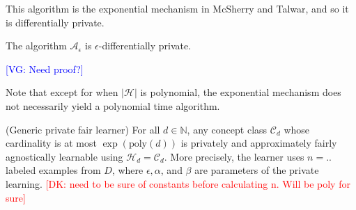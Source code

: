 \documentclass[format = sigconf]{acmart}
\newcommand{\dk}[1]{\textcolor{red}{[DK: #1]}}
\newcommand{\vg}[1]{\textcolor{blue}{[VG: #1]}}
\newcommand{\A}{\mathcal{A}}
\renewcommand{\H}{\mathcal{H}}
\renewcommand{\C}{\mathcal{C}}
\newcommand{\1}{\mathbbm{1}}
\newcommand{\eps}{\epsilon}
\theoremstyle{definition}
\begin{document}
This algorithm is the exponential mechanism in McSherry and Talwar, and so it is differentially private.

\begin{lemma}
  The algorithm $\A_\eps$ is $\eps$-differentially private.
\end{lemma}
\vg{Need proof?}

Note that except for when $|\H|$ is polynomial, the exponential
mechanism does not necessarily yield a polynomial time algorithm.


\begin{theorem}
	(Generic private fair learner) For all $d \in \mathbb{N}$, any
  concept class $\C_d$ whose cardinality is at most
  $\exp(\text{poly}(d))$ is privately and approximately fairly
  agnostically learnable using $\H_d = \C_d$. More precisely, the
  learner uses $n = ..$ labeled examples from $D$, where $\eps,
  \alpha$, and $\beta$ are parameters of the private learning.
  \dk {need to be sure of constants before calculating n. Will be poly for sure}
\end{theorem}
\end{document}
